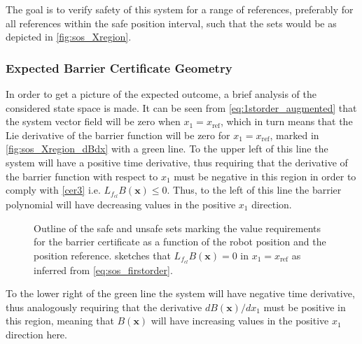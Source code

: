 The goal is to verify safety of this system for a range of references, preferably for all references within the safe position interval, such that the sets would be as depicted in \autoref{fig:sos_Xregion}.

\subsubsection{Expected Barrier Certificate Geometry}

\vspace{-2mm}
In order to get a picture of the expected outcome, a brief analysis of the considered state space is made.
It can be seen from \autoref{eq:1storder_augmented} that the system vector field will be zero when $x_1=x_\text{ref}$, which in turn means that the Lie derivative of the barrier function will be zero for $x_1=x_\text{ref}$, marked in \autoref{fig:sos_Xregion_dBdx} with a green line. 
To the upper left of this line the system will have a positive time derivative, thus requiring that the derivative of the barrier function with respect to $x_1$ must be negative in this region in order to comply with \autoref{cer3} i.e. $L_{f_{cl}}B(\mathbf{x}) \leq 0$. 
Thus, to the left of this line the barrier polynomial will have decreasing values in the positive $x_1$ direction. 
\begin{figure}[htbp]
	\centering
	\hspace{3mm}
	\hspace{3mm}
	\caption{Outline of the safe and unsafe sets marking the value requirements for the barrier certificate as a function of the robot position and the  position reference. %
		 sketches that $L_{f_{cl}}B(\mathbf{x})=0$  in $x_1=x_\text{ref}$ as inferred from \autoref{eq:sos_firstorder}. %
	}
	\label{fig:sets_reference}
\end{figure}
To the lower right of the green line the system will have negative time derivative, thus analogously requiring that the derivative $dB(\textbf{x})/dx_1$ must be positive in this region, meaning that $B(\mathbf{x})$ will have increasing values in the positive $x_1$ direction here.

